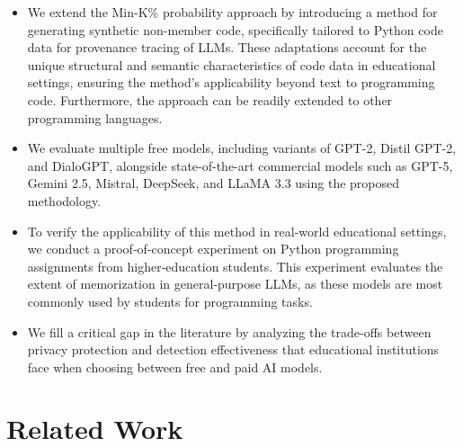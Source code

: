 \documentclass[runningheads]{llncs}
\begin{document}
\begin{itemize}
    \item We extend the Min-K\% probability approach by introducing a method for generating synthetic non-member code, specifically tailored to Python code data for provenance tracing of LLMs. These adaptations account for the unique structural and semantic characteristics of code data in educational settings, ensuring the method’s applicability beyond text to programming code. Furthermore, the approach can be readily extended to other programming languages.
    


    \item We evaluate multiple free models, including variants of GPT-2, Distil GPT-2, and DialoGPT, alongside state-of-the-art commercial models such as GPT-5, Gemini 2.5, Mistral, DeepSeek, and LLaMA 3.3 using the proposed methodology.

    \item To verify the applicability of this method in real-world educational settings, we conduct a proof‑of‑concept experiment on Python programming assignments from higher‑education students. This experiment evaluates the extent of memorization in general‑purpose LLMs, as these models are most commonly used by students for programming tasks.


    \item We fill a critical gap in the literature by analyzing the trade-offs between privacy protection and detection effectiveness that educational institutions face when choosing between free and paid AI models.
\end{itemize}


\section{Related Work}
\end{document}
